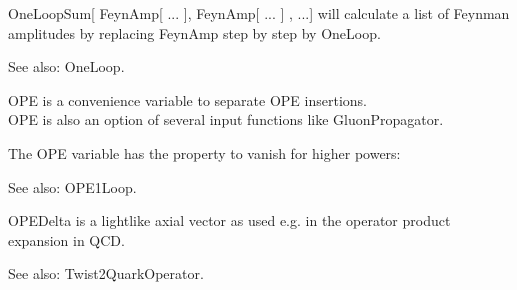 OneLoopSum[ FeynAmp[ ... ], FeynAmp[ ... ] , ...] will calculate a list of Feynman amplitudes by replacing FeynAmp step by step by
  OneLoop.

See also:  OneLoop.



OPE is a convenience variable to separate OPE insertions.\\
OPE is also an option of several input functions like GluonPropagator.

The OPE variable has the property to vanish for higher powers:



See also:  OPE1Loop.



OPEDelta is a lightlike axial vector as used e.g. in the operator product expansion in QCD.

See also:  Twist2QuarkOperator.




